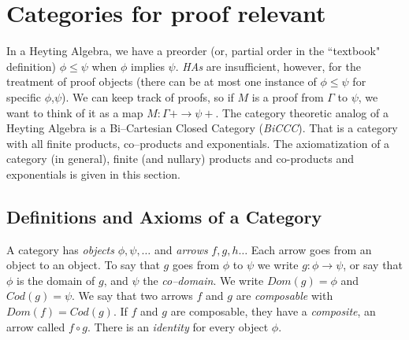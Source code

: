 \section{Categories for proof relevant }

In a Heyting Algebra, we have a preorder (or, partial order in the ``textbook" definition) $\phi\leq \psi$ when $\phi$ implies $\psi$. \emph{HAs} are insufficient, however, for the treatment of proof objects (there can be at most one instance of $\phi\leq\psi$ for specific $\phi$,$\psi$). We can  keep track of proofs, so if $M$ is a proof from  $\Gamma$ to $\psi$, we want to think of it as a map $M:\Gamma+\to \psi+$. The category theoretic analog of a Heyting 	Algebra is a Bi--Cartesian Closed Category (\emph{BiCCC}). That is a category with all finite products, co--products and exponentials. The axiomatization of a category (in general), finite (and nullary) products and co-products and exponentials is given in this section. 

\subsection{Definitions and Axioms of a Category}
A category has \emph{objects} $\phi,\psi, \ldots$ and \emph{arrows} $f,g,h\ldots$ Each arrow goes from an object to an object. To say that $g$ goes from $\phi$ to $\psi$ we write $g:\phi\rightarrow\psi$, or say that $\phi$ is the domain of $g$, and $\psi$ the \emph{co--domain}. We write $Dom(g)=\phi$ and $Cod(g)=\psi$.
We say that two arrows $f$ and $g$ are \emph{composable} with $Dom(f)=Cod(g)$. If $f$ and $g$ are composable, they have a \emph{composite}, an arrow called $f\circ g$. There is an \emph{identity} for every object $\phi$.
\begin{mdframed}
\end{mdframed}



